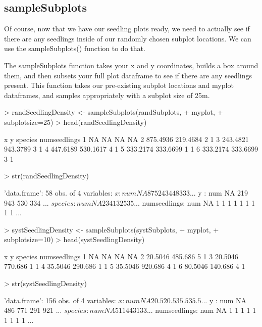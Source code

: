 \documentclass{article}
\begin{document}
\subsection{sampleSubplots}
Of course, now that we have our seedling plots ready, we need to actually see if there are any seedlings inside of our randomly chosen subplot locations. We can use the sampleSubplots() function to do that.

The sampleSubplots function takes your x and y coordinates, builds a box around them, and then subsets your full plot dataframe to see if there are any seedlings present. This function takes our pre-existing subplot locations and myplot dataframes, and samples appropriately with a subplot size of 25m.

\begin{Schunk}
\begin{Sinput}
> randSeedlingDensity <- sampleSubplots(randSubplots,
+                                       myplot,
+                                       subplotsize=25)
> head(randSeedlingDensity)
\end{Sinput}
\begin{Soutput}
         x        y species numseedlings
1       NA       NA      NA           NA
2 875.4936 219.4684       2            1
3 243.4821 943.3789       3            1
4 447.6189 530.1617       4            1
5 333.2174 333.6699       1            1
6 333.2174 333.6699       3            1
\end{Soutput}
\begin{Sinput}
> str(randSeedlingDensity)
\end{Sinput}
\begin{Soutput}
'data.frame':	58 obs. of  4 variables:
 $ x           : num  NA 875 243 448 333 ...
 $ y           : num  NA 219 943 530 334 ...
 $ species     : num  NA 2 3 4 1 3 2 5 3 5 ...
 $ numseedlings: num  NA 1 1 1 1 1 1 1 1 1 ...
\end{Soutput}
\begin{Sinput}
> systSeedlingDensity <- sampleSubplots(systSubplots,
+                                       myplot,
+                                       subplotsize=10)
> head(systSeedlingDensity)
\end{Sinput}
\begin{Soutput}
        x       y species numseedlings
1      NA      NA      NA           NA
2 20.5046 485.686       5            1
3 20.5046 770.686       1            1
4 35.5046 290.686       1            1
5 35.5046 920.686       4            1
6 80.5046 140.686       4            1
\end{Soutput}
\begin{Sinput}
> str(systSeedlingDensity)
\end{Sinput}
\begin{Soutput}
'data.frame':	156 obs. of  4 variables:
 $ x           : num  NA 20.5 20.5 35.5 35.5 ...
 $ y           : num  NA 486 771 291 921 ...
 $ species     : num  NA 5 1 1 4 4 3 1 3 3 ...
 $ numseedlings: num  NA 1 1 1 1 1 1 1 1 1 ...
\end{Soutput}
\end{Schunk}
\end{document}
